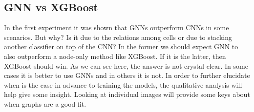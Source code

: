 \newpage
\subsection{GNN vs XGBoost}

In the first experiment it was shown that GNNs outperform CNNs in some scenarios. But why? Is it due to the relations among cells or due to stacking another classifier on top of the CNN? In the former we should expect GNN to also outperform a node-only method like XGBoost. If it is the latter, then XGBoost should win. As we can see here, the answer is not crystal clear. In some cases it is better to use GNNs and in others it is not. In order to further elucidate when is the case in advance to training the models, the qualitative analysis will help give some insight. Looking at individual images will provide some keys about when graphs are a good fit.

